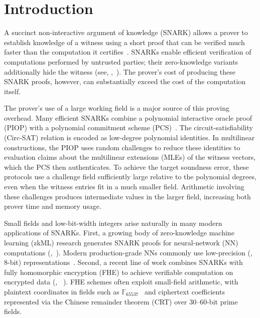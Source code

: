 \section{Introduction}

A succinct non-interactive argument of knowledge (SNARK) allows a
prover to establish knowledge of a witness using a short proof that
can be verified much faster than the computation it
certifies~\cite{innovations/BitanskyCCT12}.
SNARKs enable efficient verification of computations performed by
untrusted parties; their zero-knowledge variants additionally
hide the witness (see, \eg,~\cite{tcc/BootleCG20,%
eurocrypt/BootleCL22,%
eurocrypt/BuenzFS20,%
eurocrypt/ChenBBZ23,%
eurocrypt/ChiesaHMMVW20,%
eurocrypt/ChiesaOS20,%
iacr/GabizonWC19,%
crypto/GolovnevLSTW23,%
eurocrypt/Groth16,%
crypto/Setty20,%
iacr/SettyL20}).
The prover's cost of producing these SNARK proofs, however, can substantially
exceed the cost of the computation itself.

The prover's use of a large working field is a major source
of this proving overhead.
Many efficient SNARKs combine a polynomial interactive oracle
proof (PIOP) with a polynomial commitment scheme
(PCS)~\cite{tcc/Ben-SassonCS16,eurocrypt/BunzFS20,%
eurocrypt/ChiesaHMMVW20,iacr/GabizonWC19,ccs/MallerBKM19}.
The circuit-satisfiability (Circ-SAT) relation is encoded as low-degree
polynomial identities.
In multilinear constructions, the PIOP uses random challenges
to reduce these identities to evaluation claims about the
multilinear extensions (MLEs) of the witness vectors, which
the PCS then authenticates.
To achieve the target soundness error, these protocols use
a challenge field sufficiently large relative to the polynomial
degrees, even when the witness entries fit in a much smaller field.
Arithmetic involving these challenges produces intermediate
values in the larger field, increasing both prover time
and memory usage.

Small fields and low-bit-width integers arise naturally in many modern
applications of SNARKs.
First, a growing body of zero-knowledge machine learning (zkML)
research generates SNARK proofs for neural-network (NN) computations
(\eg,~\cite{ccs/Balbas0VRS23,%
asiacrypt/CCYY25,%
nips/GhodsiGG17,%
iacr/GuoGQZ25,%
esorics/KeufferMC18,%
uss/Weng0XK021,%
ccs/LiuXZ21,%
iacr/FengQZDC21,%
corr/KangHSS22,%
ccs/GargGJMMPW23,%
tifs/WengWTYL23,%
tdsc/LeeKKO24,%
ccs/SunLZ24,%
ccs/AbbaszadehPK024,%
popets/WangH23,%
icml/WaiwitlikhitS0H24,%
sp/QuGYZ26,%
ccs/RiasiWBVH25,%
uss/GuoLHQTZ25,%
uss/0001SLLGCZ25}).
Modern production-grade NNs commonly use low-precision (\eg, 8-bit)
representations~\cite{corr/micikevicius22}.
Second, a recent line of work combines SNARKs with fully homomorphic
encryption (FHE) to achieve verifiable computation on encrypted
data (\eg, ~\cite{ccs/FioreGP14,%
pkc/FioreNP20,%
pkc/BoisCFK21,%
joc/GaneshNS23,%
cic/AtapoorBPS24,%
wahc/KnabenhansVMH24,%
crypto/GargGW24,%
asiacrypt/AranhaCGS25,%
crypto/CascudoCCFGS25,%
ccs/ThibaultW25,%
cic/GamaBKSV25,%
ccs/ZhangWLXDFL25,%
iacr/PeshawariaLFT25}).
FHE schemes often exploit small-field arithmetic, with plaintext
coordinates in fields such as
\(\mathbb{F}_{65537}\)~\cite{asiacrypt/AranhaCGS25}
and ciphertext coefficients represented via the Chinese remainder
theorem (CRT) over 30--60-bit prime fields.

